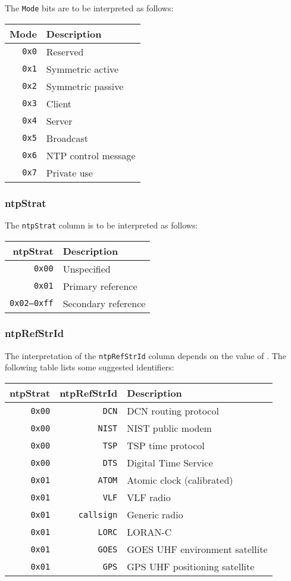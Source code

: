 \documentclass[documentation]{subfiles}
\begin{document}
The {\tt Mode} bits are to be interpreted as follows:
\begin{longtable}{rl}
    \toprule
    {\bf Mode} & {\bf Description}\\
    \midrule\endhead%
    {\tt 0x0} & Reserved\\
    {\tt 0x1} & Symmetric active\\
    {\tt 0x2} & Symmetric passive\\
    {\tt 0x3} & Client\\
    {\tt 0x4} & Server\\
    {\tt 0x5} & Broadcast\\
    {\tt 0x6} & NTP control message\\
    {\tt 0x7} & Private use\\
    \bottomrule
\end{longtable}

\subsubsection{ntpStrat}\label{ntpStrat}
The {\tt ntpStrat} column is to be interpreted as follows:
\begin{longtable}{rl}
    \toprule
    {\bf ntpStrat} & {\bf Description}\\
    \midrule\endhead%
    {\tt 0x00} & Unspecified \\
    {\tt 0x01} & Primary reference\\
    {\tt 0x02--0xff} & Secondary reference\\
    \bottomrule
\end{longtable}

\subsubsection{ntpRefStrId}\label{ntpRefStrId}
The interpretation of the {\tt ntpRefStrId} column depends on the value of .
The following table lists some suggested identifiers:
\begin{longtable}{rrl}
    \toprule
    {\bf ntpStrat} & {\bf ntpRefStrId} & {\bf Description}\\
    \midrule\endhead%
    {\tt 0x00} & {\tt DCN}      & DCN routing protocol\\
    {\tt 0x00} & {\tt NIST}     & NIST public modem\\
    {\tt 0x00} & {\tt TSP}      & TSP time protocol\\
    {\tt 0x00} & {\tt DTS}      & Digital Time Service\\
    {\tt 0x01} & {\tt ATOM}     & Atomic clock (calibrated)\\
    {\tt 0x01} & {\tt VLF}      & VLF radio\\
    {\tt 0x01} & {\tt callsign} & Generic radio\\
    {\tt 0x01} & {\tt LORC}     & LORAN-C\\
    {\tt 0x01} & {\tt GOES}     & GOES UHF environment satellite\\
    {\tt 0x01} & {\tt GPS}      & GPS UHF positioning satellite\\
    \bottomrule
\end{longtable}
\end{document}
